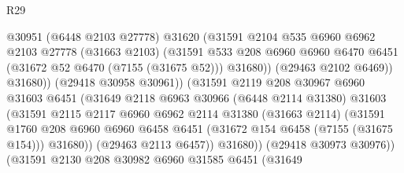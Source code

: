 \begin{lexlean}{R29}
\begin{coremodule}
                                  @30951
                                  (@6448 @2103 @27778)
                                  @31620
                                  (@31591
                                    @2104
                                    @535
                                    @6960
                                    @6962
                                    @2103
                                    @27778
                                    (@31663 @2103)
                                    (@31591
                                      @533
                                      @208
                                      @6960
                                      @6960
                                      @6470
                                      @6451
                                      (@31672 @52 @6470 (@7155 (@31675 @52)))
                                      @31680))
                                  (@29463 @2102 @6469))
                                @31680))
                            (@29418 @30958 @30961))
                          (@31591
                            @2119
                            @208
                            @30967
                            @6960
                            @31603
                            @6451
                            (@31649
                              @2118
                              @6963
                              @30966
                              (@6448 @2114 @31380)
                              @31603
                              (@31591
                                @2115
                                @2117
                                @6960
                                @6962
                                @2114
                                @31380
                                (@31663 @2114)
                                (@31591
                                  @1760
                                  @208
                                  @6960
                                  @6960
                                  @6458
                                  @6451
                                  (@31672 @154 @6458 (@7155 (@31675 @154)))
                                  @31680))
                              (@29463 @2113 @6457))
                            @31680))
                        (@29418 @30973 @30976))
                      (@31591
                        @2130
                        @208
                        @30982
                        @6960
                        @31585
                        @6451
                        (@31649

\end{coremodule}
\end{lexlean}
